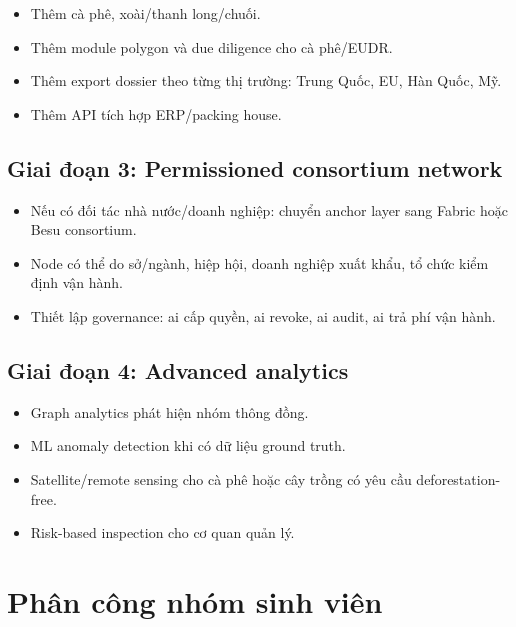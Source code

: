 \documentclass[12pt,a4paper]{article}
\begin{document}
\begin{itemize}[leftmargin=2em]
    \item Thêm cà phê, xoài/thanh long/chuối.
    \item Thêm module polygon và due diligence cho cà phê/EUDR.
    \item Thêm export dossier theo từng thị trường: Trung Quốc, EU, Hàn Quốc, Mỹ.
    \item Thêm API tích hợp ERP/packing house.
\end{itemize}

\subsection{Giai đoạn 3: Permissioned consortium network}

\begin{itemize}[leftmargin=2em]
    \item Nếu có đối tác nhà nước/doanh nghiệp: chuyển anchor layer sang Fabric hoặc Besu consortium.
    \item Node có thể do sở/ngành, hiệp hội, doanh nghiệp xuất khẩu, tổ chức kiểm định vận hành.
    \item Thiết lập governance: ai cấp quyền, ai revoke, ai audit, ai trả phí vận hành.
\end{itemize}

\subsection{Giai đoạn 4: Advanced analytics}

\begin{itemize}[leftmargin=2em]
    \item Graph analytics phát hiện nhóm thông đồng.
    \item ML anomaly detection khi có dữ liệu ground truth.
    \item Satellite/remote sensing cho cà phê hoặc cây trồng có yêu cầu deforestation-free.
    \item Risk-based inspection cho cơ quan quản lý.
\end{itemize}

\section{Phân công nhóm sinh viên}
\end{document}
